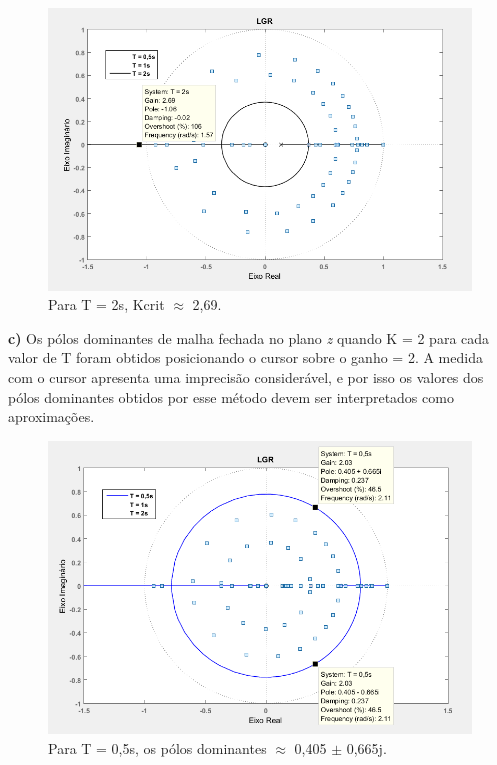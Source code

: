 \documentclass{article}
\begin{document}
    \begin{figure}[H]
       \centering
            \includegraphics[width=1\linewidth]{images/LGR_Kcrit2.png}
            \caption{Para T = 2s, Kcrit $\approx$ 2,69.}
            \label{fig:Kcrit2}
    \end{figure}

    \clearpage

    {\textbf{c)} Os pólos dominantes de malha fechada no plano \textit{z} quando K = 2 para cada valor de T foram obtidos posicionando o cursor sobre o ganho = 2. A medida com o cursor apresenta uma imprecisão considerável, e por isso os valores dos pólos dominantes obtidos por esse método devem ser interpretados como aproximações.}

    \vspace{7mm}
    \begin{figure}[H]
       \centering
            \includegraphics[width=.9\linewidth]{images/LGR_PoloDom05.png}
            \caption{Para T = 0,5s, os pólos dominantes $\approx$ 0,405 $\pm$ 0,665j.}
            \label{fig:poloDom05}
    \end{figure}
\end{document}
